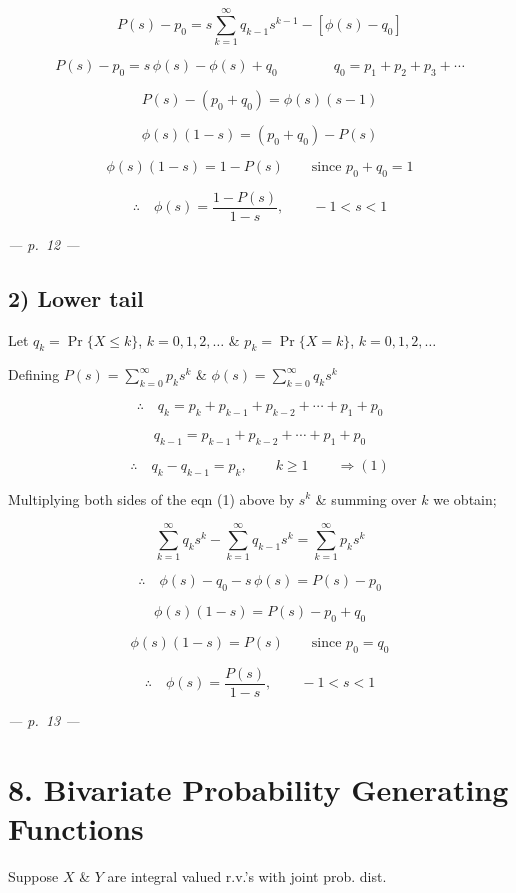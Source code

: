 \documentclass[
]{article}
\begin{document}
\[P(s) - p_0 = s \sum_{k=1}^{\infty} q_{k-1} s^{k-1} - \left[\phi(s) - q_0\right]\]

\[P(s) - p_0 = s\, \phi(s) - \phi(s) + q_0 \qquad\qquad q_0 = p_1 + p_2 + p_3 + \cdots\]

\[P(s) - (p_0 + q_0) = \phi(s)(s - 1)\]

\[\phi(s)(1 - s) = (p_0 + q_0) - P(s)\]

\[\phi(s)(1 - s) = 1 - P(s) \qquad \text{since } p_0 + q_0 = 1\]

\[\therefore \quad \phi(s) = \frac{1 - P(s)}{1 - s}, \qquad -1 < s < 1\]

\emph{--- p.~12 ---}

\subsection{2) Lower tail}\label{lower-tail}

Let \(q_k = \Pr\{X \le k\}\), \(k = 0, 1, 2, \ldots\) \&
\(p_k = \Pr\{X = k\}\), \(k = 0, 1, 2, \ldots\)

Defining \(P(s) = \sum_{k=0}^{\infty} p_k s^k\) \&
\(\phi(s) = \sum_{k=0}^{\infty} q_k s^k\)

\[\therefore \quad q_k = p_k + p_{k-1} + p_{k-2} + \cdots + p_1 + p_0\]

\[q_{k-1} = p_{k-1} + p_{k-2} + \cdots + p_1 + p_0\]

\[\therefore \quad q_k - q_{k-1} = p_k, \qquad k \ge 1 \qquad \Rightarrow (1)\]

Multiplying both sides of the eqn (1) above by \(s^k\) \& summing over
\(k\) we obtain;

\[\sum_{k=1}^{\infty} q_k s^k - \sum_{k=1}^{\infty} q_{k-1} s^k = \sum_{k=1}^{\infty} p_k s^k\]

\[\therefore \quad \phi(s) - q_0 - s\, \phi(s) = P(s) - p_0\]

\[\phi(s)(1 - s) = P(s) - p_0 + q_0\]

\[\phi(s)(1 - s) = P(s) \qquad \text{since } p_0 = q_0\]

\[\therefore \quad \phi(s) = \frac{P(s)}{1 - s}, \qquad -1 < s < 1\]

\emph{--- p.~13 ---}

\section{8. Bivariate Probability Generating
Functions}\label{bivariate-probability-generating-functions}

Suppose \(X\) \& \(Y\) are integral valued r.v.'s with joint prob. dist.
\end{document}
